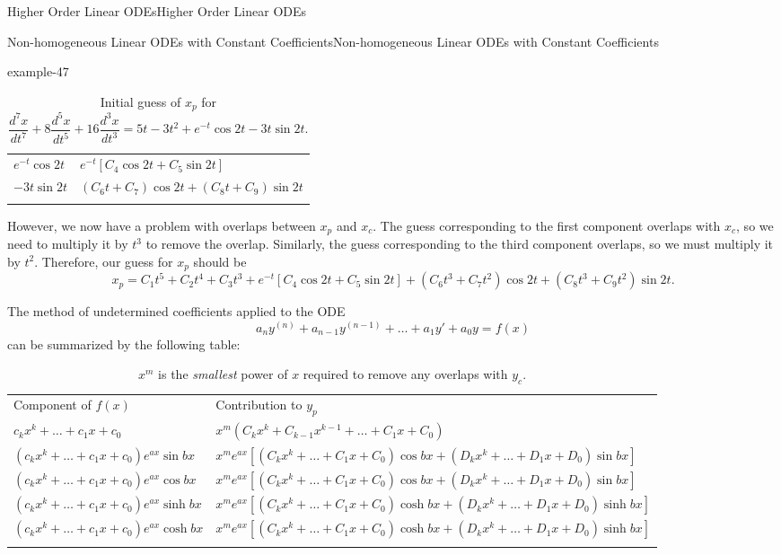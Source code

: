 \documentclass[10pt,]{book}
\numberwithin{equation}{section}
\newcommand{\hrulethick} {\noalign{\hrule height 0.11em}}
\newcommand{\dv}[3][]{\dfrac{d^{#1} #2}{d #3^{#1}}}
\newcommand{\brackets}[1]{\left[ #1 \right]}
\newcommand{\parens}[1]{\left( #1 \right)}
\begin{document}
\begin{chapterptx}{Higher Order Linear ODEs}{}{Higher Order Linear ODEs}{}{}
\begin{sectionptx}{Non-homogeneous Linear ODEs with Constant Coefficients}{}{Non-homogeneous Linear ODEs with Constant Coefficients}{}{}
\begin{example}{}{example-47}
\begin{table}
\begin{tabular}{ll}
\(e^{-t}\cos2t\)&\(e^{-t}\brackets{C_{4}\cos2t+C_{5}\sin2t}\)\tabularnewline[0pt]
\(-3t\sin2t\)&\(\parens{C_{6}t+C_{7}}\cos2t+\parens{C_{8}t+C_{9}}\sin2t\)\tabularnewline\hrulethick
\end{tabular}
\caption{Initial guess of \(x_{p}\) for \(\dv[7]{x}{t}+8\dv[5]{x}{t}+16\dv[3]{x}{t} = 5t-3t^{2}+e^{-t}\cos2t-3t\sin2t.\)\label{table-6}}
\end{table}
\hypertarget{p-291}{}%
However, we now have a problem with overlaps between \(x_{p}\) and \(x_{c}\). The guess corresponding to the first component overlaps with \(x_{c}\), so we need to multiply it by \(t^{3}\) to remove the overlap. Similarly, the guess corresponding to the third component overlaps, so we must multiply it by \(t^{2}\). Therefore, our guess for \(x_{p}\) should be%
\begin{equation*}
x_{p} = C_{1}t^{5}+C_{2}t^{4}+C_{3}t^{3}+e^{-t}\brackets{C_{4}\cos2t+C_{5}\sin2t}+(C_{6}t^{3}+C_{7}t^{2})\cos2t+(C_{8}t^{3}+C_{9}t^{2})\sin2t.
\end{equation*}
%
\end{example}
\hypertarget{p-292}{}%
The method of undetermined coefficients applied to the ODE%
\begin{equation*}
a_{n}y^{(n)}+a_{n-1}y^{(n-1)}+\dots+a_{1}y'+a_{0}y = f(x)   
\end{equation*}
can be summarized by the following table:%
\begin{table}
\centering
\begin{tabular}{ll}\hrulethick
Component of \(f(x)\)&Contribution to \(y_{p}\)\tabularnewline\hrulethick
\(c_{k}x^{k}+\dots+c_{1}x+c_{0}\)&\(x^{m}(C_{k}x^{k}+C_{k-1}x^{k-1}+\dots+C_{1}x+C_{0})\)\tabularnewline[0pt]
\((c_{k}x^{k}+\dots+c_{1}x+c_{0})e^{ax}\sin bx\)&\(x^{m}e^{ax}\brackets{(C_{k}x^{k}+\dots+C_{1}x+C_{0})\cos bx+(D_{k}x^{k}+\dots+D_{1}x+D_{0})\sin bx}\)\tabularnewline[0pt]
\((c_{k}x^{k}+\dots+c_{1}x+c_{0})e^{ax}\cos bx\)&\(x^{m}e^{ax}\brackets{(C_{k}x^{k}+\dots+C_{1}x+C_{0})\cos bx+(D_{k}x^{k}+\dots+D_{1}x+D_{0})\sin bx}\)\tabularnewline[0pt]
\((c_{k}x^{k}+\dots+c_{1}x+c_{0})e^{ax}\sinh bx\)&\(x^{m}e^{ax}\brackets{(C_{k}x^{k}+\dots+C_{1}x+C_{0})\cosh bx+(D_{k}x^{k}+\dots+D_{1}x+D_{0})\sinh bx}\)\tabularnewline[0pt]
\((c_{k}x^{k}+\dots+c_{1}x+c_{0})e^{ax}\cosh bx\)&\(x^{m}e^{ax}\brackets{(C_{k}x^{k}+\dots+C_{1}x+C_{0})\cosh bx+(D_{k}x^{k}+\dots+D_{1}x+D_{0})\sinh bx}\)\tabularnewline\hrulethick
\end{tabular}
\caption{\(x^m\) is the \emph{smallest} power of \(x\) required to remove any overlaps with \(y_{c}\).\label{table-7}}

\end{table}
\end{sectionptx}
\end{chapterptx}
\end{document}
